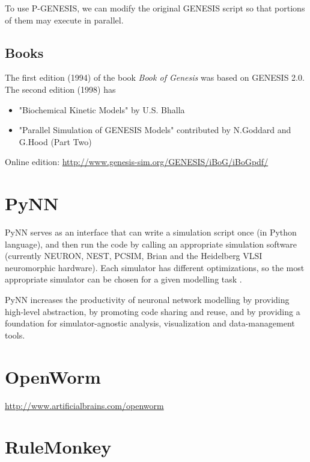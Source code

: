 To use P-GENESIS, we can modify the original GENESIS script so that portions of
them may execute in parallel. 



\subsection{Books}

The first edition (1994) of the book {\it Book of Genesis} was based on GENESIS
2.0. The second edition (1998) has
\begin{itemize}
  \item   "Biochemical Kinetic Models" by U.S. Bhalla
 
  \item   "Parallel Simulation of GENESIS Models" contributed by N.Goddard and
  G.Hood (Part Two)
\end{itemize}
Online edition: \url{http://www.genesis-sim.org/GENESIS/iBoG/iBoGpdf/}




\section{PyNN}
\label{sec:PyNN}

PyNN serves as an interface that can write a simulation script once (in Python
language), and then run the code by calling an appropriate simulation software
(currently NEURON, NEST, PCSIM, Brian and the Heidelberg VLSI neuromorphic
hardware). Each simulator has different optimizations, so the most appropriate
simulator can be chosen for a given modelling task \citep{davison2009}.

PyNN increases the productivity of neuronal network modelling by providing
high-level abstraction, by promoting code sharing and reuse, and by providing a
foundation for simulator-agnostic analysis, visualization and data-management
tools.


\section{OpenWorm}
\label{sec:OpenWorm}

\url{http://www.artificialbrains.com/openworm}

\section{RuleMonkey}
\label{sec:RuleMonkey}


